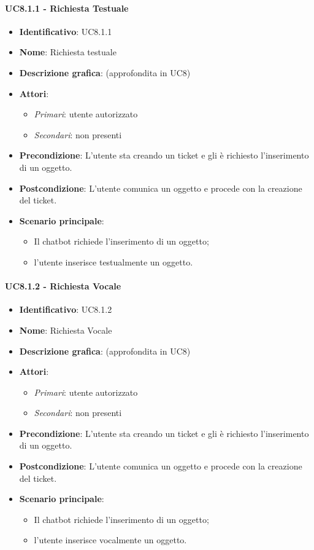 \paragraph{UC8.1.1 - Richiesta Testuale}
\begin{itemize}
   \item \textbf{Identificativo}: UC8.1.1
   \item \textbf{Nome}: Richiesta testuale
   \item \textbf{Descrizione grafica}: (approfondita in UC8)
   \item \textbf{Attori}:
   \begin{itemize} 
       \item \textit{Primari}: utente autorizzato
       \item \textit{Secondari}: non presenti
   \end{itemize}
       \item \textbf{Precondizione}: L'utente sta creando un ticket e gli è richiesto l'inserimento di un oggetto.
       \item \textbf{Postcondizione}: L'utente comunica un oggetto e procede con la creazione del ticket. 
    \item \textbf{Scenario principale}: 
       \begin{itemize}
           \item Il chatbot richiede l'inserimento di un oggetto;
           \item l'utente inserisce testualmente un oggetto.
       \end{itemize}
\end{itemize}

\paragraph{UC8.1.2 - Richiesta Vocale}
\begin{itemize}
   \item \textbf{Identificativo}: UC8.1.2
   \item \textbf{Nome}: Richiesta Vocale
   \item \textbf{Descrizione grafica}: (approfondita in UC8)
   \item \textbf{Attori}:
   \begin{itemize} 
       \item \textit{Primari}: utente autorizzato
       \item \textit{Secondari}: non presenti
   \end{itemize}
       \item \textbf{Precondizione}: L'utente sta creando un ticket e gli è richiesto l'inserimento di un oggetto.
       \item \textbf{Postcondizione}: L'utente comunica un oggetto e procede con la creazione del ticket. 
    \item \textbf{Scenario principale}: 
       \begin{itemize}  
        \item Il chatbot richiede l'inserimento di un oggetto;
        \item l'utente inserisce vocalmente un oggetto.
       \end{itemize}
\end{itemize}


